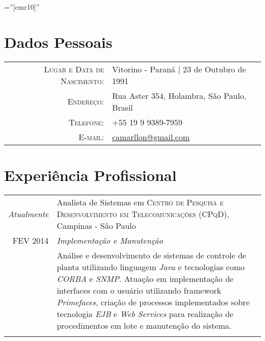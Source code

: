 \documentclass[a4paper,10pt]{article} %
\begin{document}
\pagestyle{empty} %

\font\fb=''[cmr10]'' %

\begin{samepage}
\par{\bigskip\par} %

\section{Dados Pessoais}

\begin{tabular}{rl}
\textsc{Lugar e Data de Nascimento:} & Vitorino - Paraná | 23 de Outubro de 1991 \\
\textsc{Endereço:} & Rua Aster 354, Holambra, São Paulo, Brasil\\
\textsc{Telefone:} & +55 19 9 9389-7959\\
\textsc{E-mail:} & \href{mailto:camarllon@gmail.com}{camarllon@gmail.com}
\end{tabular}


\section{Experiência Profissional}

\begin{tabular}{r|p{11cm}}

\emph{Atualmente} & Analista de Sistemas em \textsc{Centro de Pesquisa e Desenvolvimento em Telecomunicações (CPqD)}, Campinas - São Paulo \emph{} \\
\textsc{FEV 2014} & \emph{Implementação e Manutenção}\\ 
                  & \footnotesize{Análise e desenvolvimento de sistemas de controle de planta utilizando linguagem \textit{Java} e tecnologias como \textit{CORBA} e \textit{SNMP}. Atuação em implementação de interfaces com o usuário utilizando framework \textit{Primefaces}, criação de processos implementados sobre tecnologia \textit{EJB} e \textit{Web Services} para realização de procedimentos em lote e manutenção do sistema.}\\
\multicolumn{2}{c}{} \\


\end{tabular}
\end{samepage}
\end{document}
